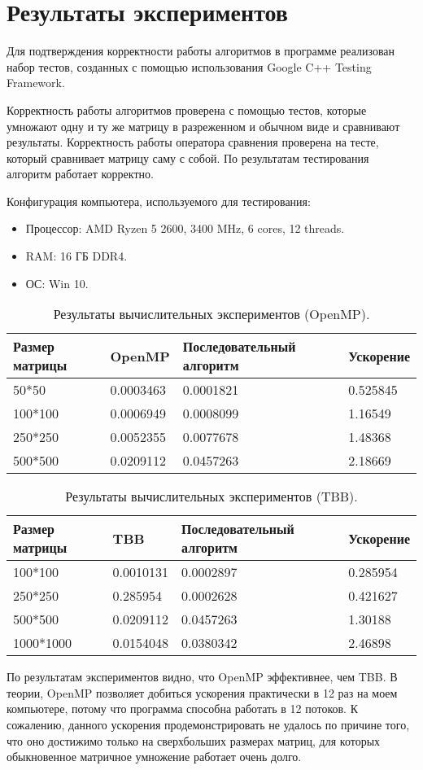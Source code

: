 \documentclass{report}
\begin{document}
\newpage
\section* {Результаты экспериментов}
Для подтверждения корректности работы алгоритмов в программе реализован набор тестов, созданных с помощью использования Google C++ Testing Framework.
\par
Корректность работы алгоритмов проверена с помощью тестов, которые умножают одну и ту же матрицу в разреженном и обычном виде и сравнивают результаты. Корректность работы оператора сравнения проверена на тесте, который сравнивает матрицу саму с собой. По результатам тестирования алгоритм работает корректно.
\par Конфигурация компьютера, используемого для тестирования:
\begin{itemize}
\item Процессор: AMD Ryzen 5 2600, 3400 MHz, 6 cores, 12 threads.
\item RAM: 16 ГБ DDR4.
\item ОС: Win 10.
\end{itemize}
\begin{table}[!h]
\caption{Результаты вычислительных экспериментов (OpenMP).}
\begin{tabular}{ | l | l | l | l |}
\hline
Размер матрицы & OpenMP & Последовательный алгоритм & Ускорение \\ \hline
50*50 & 0.0003463 & 0.0001821 & 0.525845 \\
100*100 & 0.0006949 & 0.0008099 & 1.16549 \\
250*250 & 0.0052355 & 0.0077678 & 1.48368 \\
500*500 & 0.0209112 & 0.0457263 & 2.18669 \\
\hline
\end{tabular}
\end{table}
\newpage
\begin{table}[!h]
\caption{Результаты вычислительных экспериментов (TBB).}
\begin{tabular}{ | l | l | l | l |}
\hline
Размер матрицы & TBB & Последовательный алгоритм & Ускорение \\ \hline
100*100 & 0.0010131 & 0.0002897 & 0.285954 \\
250*250 & 0.285954 & 0.0002628 & 0.421627 \\
500*500 & 0.0209112 & 0.0457263 & 1.30188 \\ 
1000*1000 & 0.0154048 & 0.0380342 &  2.46898 \\ \hline
 \end{tabular}
\end{table}
\par
По результатам экспериментов видно, что OpenMP эффективнее, чем TBB. В теории, OpenMP позволяет добиться ускорения практически в 12 раз на моем компьютере, потому что программа способна работать в 12 потоков. К сожалению, данного ускорения продемонстрировать не удалось по причине того, что оно достижимо только на сверхбольших размерах матриц, для которых обыкновенное матричное умножение работает очень долго.
\newpage
\end{document}
